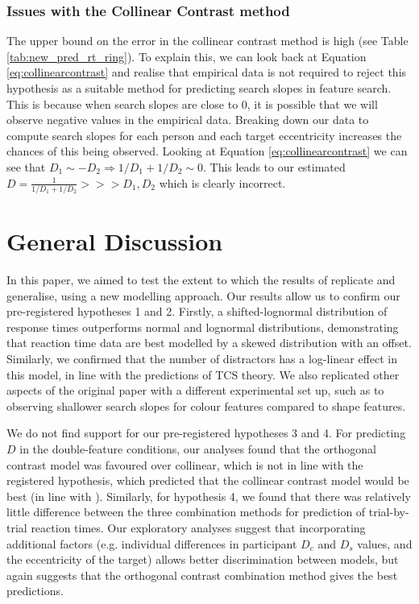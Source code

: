 \documentclass[preprint,12pt,authoryear]{elsarticle}
\begin{document}
\subsubsection{Issues with the Collinear Contrast method}
The upper bound on the error in the collinear contrast method is high (see Table \ref{tab:new_pred_rt_ring}). To explain this, we can look back at Equation \ref{eq:collinearcontrast} and realise that empirical data is not required to reject this hypothesis as a suitable method for predicting search slopes in feature search. This is because when search slopes are close to 0, it is possible that we will observe negative values in the empirical data. Breaking down our data to compute search slopes for each person and each target eccentricity increases the chances of this being observed. Looking at Equation \ref{eq:collinearcontrast} we can see that $D_1 \sim -D_2\Rightarrow 1/D_1 + 1/D_2 \sim 0$. This leads to our estimated $D = \frac{1}{1/D_1 + 1/D_2} >>> D_1, D_2$ which is clearly incorrect. 

\section{General Discussion}

In this paper, we aimed to test the extent to which the results of \cite{buetti2019predicting} replicate and generalise, using a new modelling approach. Our results allow us to confirm our pre-registered hypotheses 1 and 2. Firstly, a shifted-lognormal distribution of response times outperforms normal and lognormal distributions, demonstrating that reaction time data are best modelled by a skewed distribution with an offset. Similarly, we confirmed that the number of distractors has a log-linear effect in this model, in line with the predictions of TCS theory. We also replicated other aspects of the original \cite{buetti2019predicting} paper with a different experimental set up, such as to observing shallower search slopes for colour features compared to shape features.

We do not find support for our pre-registered hypotheses 3 and 4. For predicting $D$ in the double-feature conditions, our analyses found that the orthogonal contrast model was favoured over collinear, which is not in line with the registered hypothesis, which predicted that the collinear contrast model would be best (in line with \cite{buetti2019predicting}). Similarly, for hypothesis 4, we found that there was relatively little difference between the three combination methods for prediction of trial-by-trial reaction times. Our exploratory analyses suggest that incorporating additional factors (e.g. individual differences in participant $D_c$ and $D_s$ values, and the eccentricity of the target) allows better discrimination between models, but again suggests that the orthogonal contrast combination method gives the best predictions.
\end{document}
